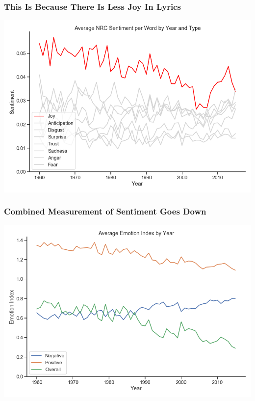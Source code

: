 \documentclass[10pt]{beamer}
\begin{document}
\begin{frame}
\frametitle{This Is Because There Is Less Joy In Lyrics}

{
    \centering
    \includegraphics[width=\textwidth, height=\textheight,keepaspectratio]{average_nrc_sentiment_by_year.png}
    \par
}

\end{frame}

\begin{frame}
\frametitle{Combined Measurement of Sentiment Goes Down}

{
    \centering
    \includegraphics[width=\textwidth, height=\textheight,keepaspectratio]{emotion_index_by_year.png}
    \par
}

\end{frame}
\end{document}
